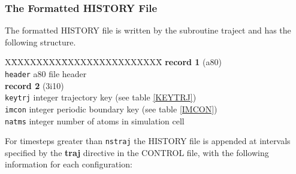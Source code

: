 \subsubsection{The Formatted HISTORY File}

The formatted HISTORY file is written by the subroutine {\sc traject}
and  has the following structure.
\begin{tabbing}
X\=XXXXXXXX\=XXXXXXXXXXXXXXXX\=\kill
{\bf record 1} (a80)\\
\> {\tt header} \> a80 \> file header \\
{\bf record 2} (3i10)\\
\> {\tt keytrj} \> integer \> trajectory key (see table \ref{KEYTRJ})\\
\> {\tt imcon} \> integer \> periodic boundary key (see table \ref{IMCON})\\
\> {\tt natms} \> integer \> number of atoms in simulation cell\\
\end{tabbing}

For timesteps greater than {\tt nstraj} the HISTORY file is appended at
intervals specified by the {\bf traj} directive in the CONTROL file,
with the following information for each configuration:

